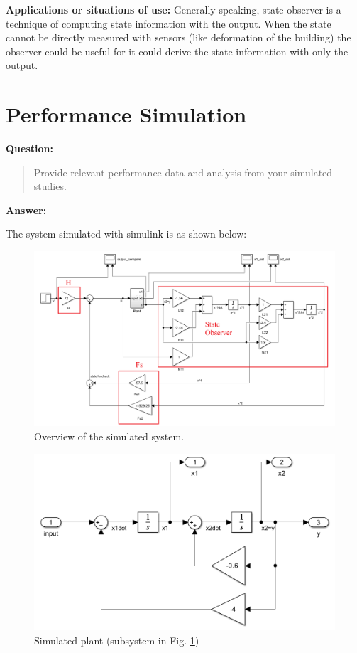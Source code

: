 \documentclass[12pt, oneside]{article}
\begin{document}
\textbf{Applications or situations of use:}
Generally speaking, state observer is a technique of computing state information with the output.
When the state cannot be directly measured with sensors (like deformation of the building) the observer could be useful for it could derive the state information with only the output. 

\section{Performance Simulation}
\label{Performance Simulation}
\textbf{Question:}
\begin{quote}
    Provide relevant performance data and analysis from your simulated studies.
\end{quote}
\textbf{Answer:}

The system simulated with simulink is as shown below:
\begin{figure}[htbp]
    \centering
    \includegraphics[width = \linewidth]{Report/pics/WholeSystem.png}
    \caption{Overview of the simulated system.}
    \label{fig:WholeSystem}
\end{figure}

\begin{figure}[htbp]
    \centering
    \includegraphics[width=0.9\linewidth]{Report/pics/Plant.png}
    \caption{Simulated plant (subsystem in Fig. \ref{fig:WholeSystem})}
    \label{fig:Plant}
\end{figure}
\end{document}
